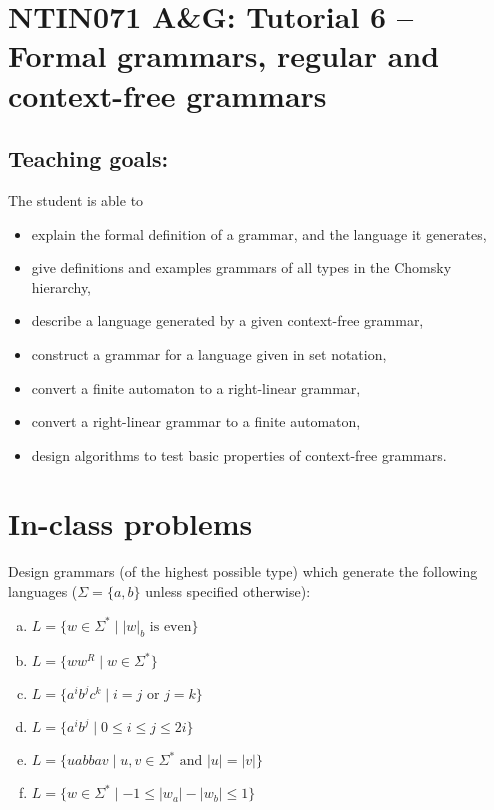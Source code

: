 \documentclass[a4paper,12pt]{amsart}
\begin{document}
\thispagestyle{empty}

\section*{NTIN071 A\&G: Tutorial 6 -- Formal grammars, regular and context-free grammars}

\medskip

\subsection*{Teaching goals:} The student is able to

    \begin{itemize}\setlength{\itemsep}{0pt}
        \item explain the formal definition of a grammar, and the language it generates,
        \item give definitions and examples grammars of all types in the Chomsky hierarchy,
        \item describe a language generated by a given context-free grammar,
        \item construct a grammar for a language given in set notation,
        \item convert a finite automaton to a right-linear grammar,
        \item convert a right-linear grammar to a finite automaton,
        \item design algorithms to test basic properties of context-free grammars.
    \end{itemize}


\section*{In-class problems}


\medskip\begin{problem}

    Design grammars (of the highest possible type) which generate the following languages ($\Sigma=\{a,b\}$ unless specified otherwise):
    
    \vspace{-3pt}
    \begin{multicols}{2}
    \begin{enumerate}[(a)]
        \item $L=\{w\in\Sigma^*\mid |w|_b\text{ is even}\} $
        \item $L=\{ww^R\mid w\in \Sigma^*\}$        
        \item $L = \{a^ib^jc^k\mid i = j\text{ or }j = k\}$        
        \item $L=\{a^i b^j\mid 0\leq i\leq j\leq 2i\}$
        \item $L=\{uabbav\mid u,v\in\Sigma^*\text{ and }|u|=|v|\}$
        \item $L=\{w\in \Sigma^*\mid -1\leq |w_a|-|w_b|\leq 1\}$        
    \end{enumerate}
    \end{multicols}

\end{problem}
\end{document}
